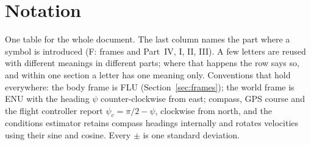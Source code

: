\section{Notation}
\label{app:notation}

One table for the whole document. The last column names the part where a symbol
is introduced (F: frames and Part~IV, I, II, III). A few letters are reused with
different meanings in different parts; where that happens the row says so, and
within one section a letter has one meaning only. Conventions that hold
everywhere: the body frame is FLU (Section~\ref{sec:frames}); the world frame is
ENU with the heading $\psi$ counter-clockwise from east; compass, GPS course and
the flight controller report $\psi_c = \pi/2 - \psi$, clockwise from north, and
the conditions estimator retains compass headings internally and rotates
velocities using their sine and cosine. Every $\pm$ is one standard deviation.

